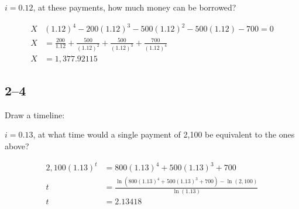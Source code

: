 \documentclass[a4paper, 12pt, reqno]{amsart}
\numberwithin{equation}{section}
\begin{document}
$i = 0.12$, at these payments, how much money can be borrowed?

\begin{equation}\nonumber
    \begin{aligned}
        X&(1.12)^4 - 200(1.12)^3 - 500(1.12)^2 - 500(1.12) - 700 = 0 \\
        X &= \frac{200}{1.12} + \frac{500}{(1.12)^2} + \frac{500}{(1.12)^3}
            + \frac{700}{(1.12)^4}  \\
        X &= 1,377.92115
    \end{aligned}
\end{equation}

\subsection*{2--4}

Draw a timeline:\\

\begin{center}
\end{center}

$i = 0.13$, at what time would a single payment of 2,100 be equivalent to the 
ones above?

\begin{equation}\nonumber
    \begin{aligned}
        2,100(1.13)^t &= 800(1.13)^4 + 500(1.13)^3 + 700        \\
        t &= \frac{\ln\left(800(1.13)^4 + 500(1.13)^3 + 700\right)
            - \ln(2,100)}{\ln(1.13)}                            \\
        t &= 2.13418
    \end{aligned}
\end{equation}
\end{document}

